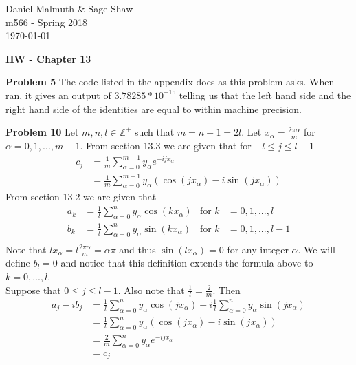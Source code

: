\documentclass[12pt]{article}
\newcommand{\problem}[1]{\hspace{-4 ex} \large \textbf{Problem #1} }
\newcommand{\ZZ}{\mathbb{Z}}
\begin{document}
	\thispagestyle{empty}
	
	\begin{flushright}
		Daniel Malmuth \& Sage Shaw \\
		m566 - Spring 2018 \\
		\today
	\end{flushright}
	
{\large \textbf{HW - Chapter 13}}\bigbreak

\problem{5} The code listed in the appendix does as this problem asks. When ran, it gives an output of $3.78285*10^{-15}$ telling us that the left hand side and the right hand side of the identities are equal to within machine precision. 

\bigbreak
\problem{10} Let $m,n,l \in \ZZ^+$ such that $m=n+1=2l$. Let $x_\alpha = \frac{2\pi \alpha}{m}$ for $\alpha=0,1,...,m-1$. From section 13.3 we are given that for $-l \leq j \leq l-1$
\begin{align*}
	c_j & = \frac{1}{m} \sum\limits_{\alpha=0}^{m-1} y_\alpha e^{-ijx_\alpha} \\
	& = \frac{1}{m} \sum\limits_{\alpha=0}^{m-1} y_\alpha \left( \cos(jx_\alpha) - i\sin(jx_\alpha)\right)
\end{align*}
From section 13.2 we are given that
\begin{align*}
	a_k &= \frac{1}{l} \sum\limits_{\alpha=0}^{n} y_\alpha \cos(k x_\alpha) & \text{for }k&=0, 1, ..., l \\
	b_k &= \frac{1}{l} \sum\limits_{\alpha=0}^{n} y_\alpha \sin(k x_\alpha) & \text{for }k&=0, 1, ..., l-1 \\
\end{align*}
Note that $lx_\alpha = l \frac{2\pi \alpha}{m} = \alpha \pi$ and thus $\sin(l x_\alpha) = 0$ for any integer $\alpha$. We will define $b_l=0$ and notice that this definition extends the formula above to $k=0,...,l$. \\
Suppose that $0 \leq j \leq l-1$. Also note that $\frac{1}{l} = \frac{2}{m}$. Then
\begin{align*}
	a_j - ib_j & = \frac{1}{l} \sum\limits_{\alpha=0}^{n} y_\alpha \cos(j x_\alpha) - i \frac{1}{l}\sum\limits_{\alpha=0}^{n} y_\alpha \sin(j x_\alpha) \\
	& = \frac{1}{l} \sum\limits_{\alpha=0}^{n} y_\alpha \left( \cos(j x_\alpha) - i\sin(j x_\alpha) \right) \\
	& = \frac{2}{m} \sum\limits_{\alpha=0}^{n} y_\alpha e^{-ijx_\alpha} \\
	& = c_j
\end{align*}
\end{document}
